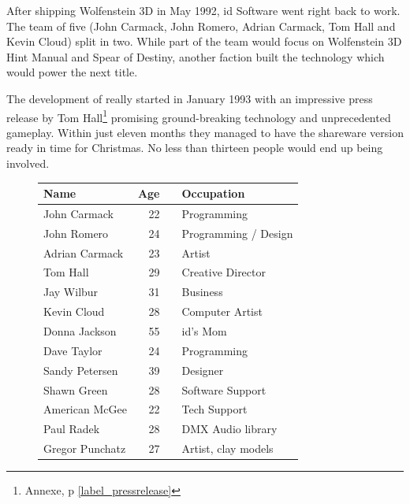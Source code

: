 \vspace{-5pt}
After shipping Wolfenstein 3D in May 1992, id Software went right back to work. The team of five (John Carmack, John Romero, Adrian Carmack, Tom Hall and Kevin Cloud) split in two. While part of the team would focus on Wolfenstein 3D Hint Manual and Spear of Destiny, another faction built the technology which would power the next title.\\
\par
The development of \doom{} really started in January 1993 with an impressive press release by Tom Hall\protect\footnote{Annexe, p \ref{label_pressrelease}} promising ground-breaking technology and unprecedented gameplay. Within just eleven months they managed to have the shareware version ready in time for Christmas. No less than thirteen people would end up being involved.\\
\par
 \begin{figure}[H]
\centering  
\begin{tabularx}{\textwidth}{L{0.3} R{0.2} L{0.1} L{0.4}  }
  \toprule
  \textbf{Name} &  \textbf{Age} & &\textbf{Occupation} \\
  \toprule 
   John Carmack & 22 &  &Programming\\
   John Romero & 24 &  &Programming / Design\\
   Adrian Carmack\protect\footnotemark & 23 &  &Artist\\
   Tom Hall\protect\footnotemark  & 29 &  &Creative Director\\
   Jay Wilbur & 31 &  &Business\\
   Kevin Cloud& 28 &  &Computer Artist\\
   Donna Jackson & 55 & &id's Mom\\   
   Dave Taylor & 24 & &Programming\\
   Sandy Petersen & 39 & &Designer\\
   Shawn Green & 28 & &Software Support\\
   American McGee & 22 & &Tech Support\\
   Paul Radek & 28 & &DMX Audio library\\
   Gregor Punchatz & 27 & &Artist, clay models\\

     \toprule
\end{tabularx}
\label{fig:Id Software team}
\end{figure}



